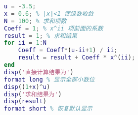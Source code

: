 \begin{lstlisting}[language=Matlab]
% 验证二项式定理(非整数幂)
u = -3.5;
x = 0.6; % |x|<1 使级数收敛
N = 100; % 求和项数
Coeff = 1; % x^ii 项前面的系数
result = 1; % 求和结果
for ii = 1:N
    Coeff = Coeff*(u-ii+1) / ii;
    result = result + Coeff * x^(ii);
end
disp('直接计算结果为')
format long % 显示全部小数位
disp((1+x)^u)
disp('求和结果为')
disp(result)
format short % 恢复默认显示
\end{lstlisting}